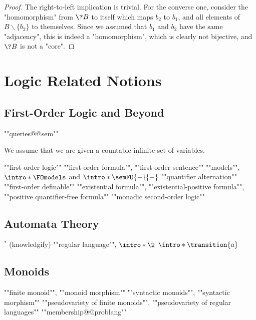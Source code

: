 \begin{proof}
	The right-to-left implication is trivial.
	For the converse one, consider the "homomorphism" from $\?B$ to itself
	which maps $b_2$ to $b_1$, and all elements of $B \smallsetminus \{b_2\}$
	to themselves. Since we assumed that $b_1$ and $b_2$ have the same "adjacency",
	this is indeed a "homomorphism", which is clearly not bijective, and
	$\?B$ is not a "core".
\end{proof}

\section{Logic Related Notions}

\subsection{First-Order Logic and Beyond}

""queries@@sem""

We assume that we are given a countable infinite set of variables.


\begin{itemize}
	\itemAP ""first-order logic""
	\itemAP ""first-order formula"", ""first-order sentence""
	\itemAP ""models"", $\intro*\FOmodels$ and $\intro*\semFO{-}{-}$
	\itemAP ""quantifier alternation""
	\itemAP ""first-order definable""
	\itemAP ""existential formula"", ""existential-positive formula"",
		""positive quantifier-free formula""
	\itemAP ""monadic second-order logic""
\end{itemize}

\subsection{Automata Theory}

\begin{itemize}
	\itemAP $^*$ (knowledgify)
	\itemAP ""regular language"", $\intro*\2$
	\itemAP $\intro*\transition{a}$
\end{itemize}

\subsection{Monoids}

\begin{itemize}
	\itemAP ""finite monoid"", ""monoid morphism""
	\itemAP ""syntactic monoids"", ""syntactic morphism""
	\itemAP ""pseudovariety of finite monoids"", ""pseudovariety of regular languages""
	\itemAP ""membership@@problang""
\end{itemize}

